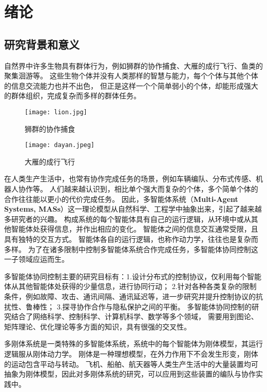 
\chapter{绪论}
\section{研究背景和意义}
自然界中许多生物具有群体行为\cite{couzin2005effective}，例如狮群的协作捕食、大雁的成行飞行、鱼类的聚集洄游等。
这些生物个体并没有人类那样的智慧与能力，每个个体与其他个体的信息交流能力也并不出色，
但正是这样一个个简单弱小的个体，却能形成强大的群体组织，完成复杂而多样的群体任务。

\begin{figure}[!htp]
    \centering
    \begin{minipage}{0.48\textwidth}
      \centering
      \texttt{[image: lion.jpg]}
      \caption{狮群的协作捕食}
      \label{fig:lion}
    \end{minipage}\hfill
    \begin{minipage}{0.48\textwidth}
      \centering
      \texttt{[image: dayan.jpeg]}
      \caption{大雁的成行飞行}
      \label{fig:dayan}
    \end{minipage}
  \end{figure}

在人类生产生活中，也常有协作完成任务的场景，例如车辆编队\cite{ren2008distributed}、分布式传感\cite{lesser2003distributed}、机器人协作\cite{ismail2018survey}等。
人们越来越认识到，相比单个强大而复杂的个体，多个简单个体的合作往往能以更小的代价完成任务。
因此，多智能体系统（\textbf{Multi-Agent Systems, MASs}）这一理论模型从自然科学、工程学中抽象出来，引起了越来越多研究者的兴趣。
构成系统的每个智能体具有自己的运行逻辑，从环境中或从其他智能体处获得信息，并作出相应的变化。
智能体之间的信息交互通常受限，且具有独特的交互方式。
智能体各自的运行逻辑，也称作动力学，往往也是复杂而多样。
为了在诸多限制中控制多智能体系统合作完成任务，多智能体协同控制这一子领域应运而生。

多智能体协同控制主要的研究目标有：1.设计分布式的控制协议，仅利用每个智能体从其他智能体处获得的少量信息，进行协同行动；
2.针对各种各类复杂的限制条件，例如故障、攻击、通讯间隔、通讯延迟等，进一步研究并提升控制协议的抗扰性、鲁棒性；
3.探寻协作合作与隐私保护之间的平衡。
多智能体协同控制的研究结合了网络科学、控制科学、计算机科学、数学等多个领域，
需要用到图论、矩阵理论、优化理论等多方面的知识，具有很强的交叉性。

多刚体系统是一类特殊的多智能体系统，系统中的每个智能体为刚体模型，其运行逻辑服从刚体动力学。
刚体是一种理想模型，在外力作用下不会发生形变，刚体的运动包含平动与转动。
飞机、船舶、航天器等人类生产生活中的大量装置均可抽象为刚体模型，因此对多刚体系统的研究，可以应用到这些装置的编队与协作实践中。

